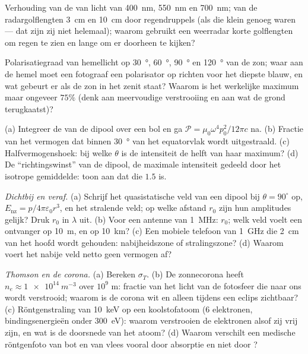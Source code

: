 \begin{exercise}[$\star$]\label{exo:b2:dipole-radiation:3}
Verhouding van de  van licht van \qty{400}{nm},
\qty{550}{nm} en \qty{700}{nm}; van de radargolflengten \qty{3}{cm} en
\qty{10}{cm} door regendruppels (als die klein genoeg waren --- dat zijn zij
niet helemaal); waarom gebruikt een weerradar korte golflengten om regen te
zien en lange om er doorheen te kijken?
\end{exercise}

\begin{exercise}[$\star$]\label{exo:b2:dipole-radiation:4}
Polarisatiegraad van hemellicht op \qty{30}{\degree}, \qty{60}{\degree},
\qty{90}{\degree} en \qty{120}{\degree} van de zon; waar aan de hemel moet
een fotograaf een polarisator op richten voor het diepste blauw, en wat
gebeurt er als de zon in het zenit staat? Waarom is het werkelijke maximum
maar ongeveer $75\%$ (denk aan meervoudige verstrooiing en aan wat de grond
terugkaatst)?
\end{exercise}

\begin{exercise}[$\star\star$]\label{exo:b2:dipole-radiation:5}
(a) Integreer de  van de dipool over een bol en ga
$\mathcal P = \mu_0\omega^4p_0^2/12\pi c$ na. (b) Fractie van het vermogen
dat binnen \qty{30}{\degree} van het equatorvlak wordt uitgestraald. (c)
Halfvermogenshoek: bij welke $\theta$ is de intensiteit de helft van haar
maximum? (d) De ``richtingswinst'' van de dipool, de maximale intensiteit
gedeeld door het isotrope gemiddelde: toon aan dat die $1.5$ is.
\end{exercise}

\begin{exercise}[$\star\star$]\label{exo:b2:dipole-radiation:6}
\emph{Dichtbij en veraf.} (a) Schrijf het quasistatische veld van een dipool
bij $\theta = 90^\circ$ op, $E_{\text{nz}} = p/4\pi\varepsilon_0r^3$, en het
stralende veld; op welke afstand $r_0$ zijn hun amplitudes gelijk? Druk
$r_0$ in $\lambda$ uit. (b) Voor een antenne van \qty{1}{MHz}: $r_0$; welk
veld voelt een ontvanger op \qty{10}{m}, en op \qty{10}{km}? (c) Een mobiele
telefoon van \qty{1}{GHz} die \qty{2}{cm} van het hoofd wordt gehouden:
nabijheidszone of stralingszone? (d) Waarom voert het nabije veld netto geen
vermogen af?
\end{exercise}

\begin{exercise}[$\star\star$]\label{exo:b2:dipole-radiation:7}
\emph{Thomson en de corona.} (a) Bereken $\sigma_T$. (b) De zonnecorona
heeft $n_e \approx \qty{1e14}{m^{-3}}$ over $10^9$ m: fractie van het licht
van de fotosfeer die naar ons wordt verstrooid; waarom is de corona wit en
alleen tijdens een eclips zichtbaar? (c) Röntgenstraling van \qty{10}{keV}
op een koolstofatoom ($6$ elektronen, bindingsenergieën onder
\qty{300}{eV}): waarom verstrooien de elektronen alsof zij vrij zijn, en wat
is de doorsnede van het atoom? (d) Waarom verschilt een medische röntgenfoto
van bot en van vlees vooral door absorptie en niet door ?
\end{exercise}

